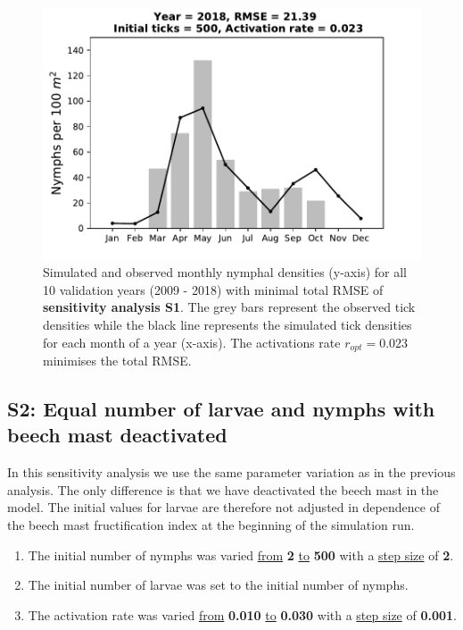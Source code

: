 \documentclass[a4paper, 11pt]{scrartcl}
\begin{document}
\begin{figure}[h!]
\begin{minipage}[c]{0.40\linewidth}
\end{minipage}
\begin{minipage}[c]{0.40\linewidth}
\includegraphics[width=\linewidth]{figures/s1/S1_2018}
\end{minipage}
\caption{Simulated and observed monthly nymphal densities (y-axis) for all 10 validation years (2009 - 2018) with minimal total RMSE of \textbf{sensitivity analysis S1}. The grey bars represent the observed tick densities while the black line represents the simulated tick densities for each month of a year (x-axis). The activations rate $r_{opt} = 0.023$ minimises the total RMSE.}
\label{fig:initial_ticks_with_beech}
\end{figure}


\newpage
\subsection{S2: Equal number of larvae and nymphs with beech mast deactivated}
In this sensitivity analysis we use the same parameter variation as in the previous analysis. The only difference is that we have deactivated the beech mast in the model. The initial values for larvae are therefore not adjusted in dependence of the beech mast fructification index at the beginning of the simulation run.

\begin{enumerate}
\item The initial number of nymphs was varied \underline{from} \textbf{2} \underline{to} \textbf{500} with a \underline{step size} of \textbf{2}.
\item The initial number of larvae was set to the initial number of nymphs.
\item The activation rate was varied \underline{from} \textbf{0.010} \underline{to} \textbf{0.030} with a \underline{step size} of \textbf{0.001}.
\end{enumerate}
\end{document}
